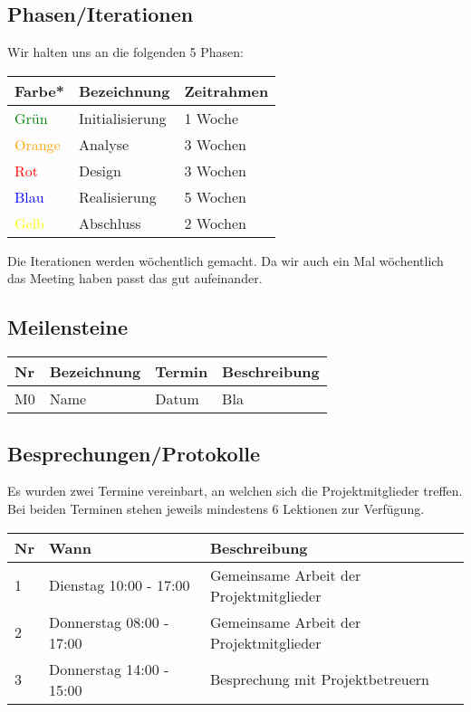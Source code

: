 \documentclass[
	ngerman,
	toc=listof, %
	toc=bibliography, %
	footnotes=multiple, %
	parskip=half, %
	numbers=noendperiod %
]{scrartcl}
\begin{document}
	\subsection{Phasen/Iterationen}
		Wir halten uns an die folgenden 5 Phasen: \\
		\begin{tabularx}{\textwidth}{lll}
			\toprule
			Farbe* & Bezeichnung & Zeitrahmen \\
			\midrule
			\textcolor{green}{Grün} & Initialisierung & 1 Woche \\
			\textcolor{orange}{Orange} & Analyse & 3 Wochen \\
			\textcolor{red}{Rot} & Design & 3 Wochen \\
			\textcolor{blue}{Blau} & Realisierung & 5 Wochen \\
			\textcolor{yellow}{Gelb} & Abschluss & 2 Wochen \\
			\bottomrule
		\end{tabularx}
	
		Die Iterationen werden wöchentlich gemacht. Da wir auch ein Mal wöchentlich das Meeting haben passt das gut aufeinander.


	\subsection{Meilensteine}
		\begin{tabularx}{0.9\linewidth}{lllX}
			\toprule
			Nr & Bezeichnung & Termin & Beschreibung \\
			\midrule
			M0 & Name & Datum & Bla \\
			\bottomrule
		\end{tabularx}

	\subsection{Besprechungen/Protokolle}
		Es wurden zwei Termine vereinbart, an welchen sich die Projektmitglieder treffen. 
		Bei beiden Terminen stehen jeweils mindestens 6 Lektionen zur Verfügung.

		\begin{tabularx}{0.9 \linewidth}{llX}
			\toprule
			Nr & Wann & Beschreibung \\
			\midrule
			1 & Dienstag 10:00 - 17:00 & Gemeinsame Arbeit der Projektmitglieder \\
			2 & Donnerstag 08:00 - 17:00 & Gemeinsame Arbeit der Projektmitglieder \\
			3 & Donnerstag 14:00 - 15:00 & Besprechung mit Projektbetreuern \\
			\bottomrule
		\end{tabularx}
\end{document}
